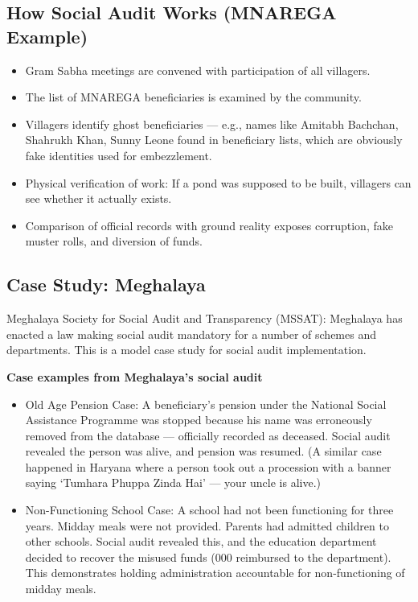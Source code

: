 \subsection{How Social Audit Works (MNAREGA Example)}
\begin{itemize}
\item Gram Sabha meetings are convened with participation of all villagers.
\item The list of MNAREGA beneficiaries is examined by the community.
\item Villagers identify ghost beneficiaries --- e.g., names like Amitabh Bachchan, Shahrukh Khan, Sunny Leone found in beneficiary lists, which are obviously fake identities used for embezzlement.
\item Physical verification of work: If a pond was supposed to be built, villagers can see whether it actually exists.
\item Comparison of official records with ground reality exposes corruption, fake muster rolls, and diversion of funds.
\end{itemize}

\subsection{Case Study: Meghalaya}
\begin{GovtPolicy}
Meghalaya Society for Social Audit and Transparency (MSSAT): Meghalaya has enacted a law making social audit mandatory for a number of schemes and departments. This is a model case study for social audit implementation.
\end{GovtPolicy}

\begin{ExampleBox}
\textbf{Case examples from Meghalaya's social audit}
\begin{itemize}
\item Old Age Pension Case: A beneficiary's pension under the National Social Assistance Programme was stopped because his name was erroneously removed from the database --- officially recorded as deceased. Social audit revealed the person was alive, and pension was resumed. (A similar case happened in Haryana where a person took out a procession with a banner saying `Tumhara Phuppa Zinda Hai' --- your uncle is alive.)
\item Non-Functioning School Case: A school had not been functioning for three years. Midday meals were not provided. Parents had admitted children to other schools. Social audit revealed this, and the education department decided to recover the misused funds (000 reimbursed to the department). This demonstrates holding administration accountable for non-functioning of midday meals.
\end{itemize}
\end{ExampleBox}


